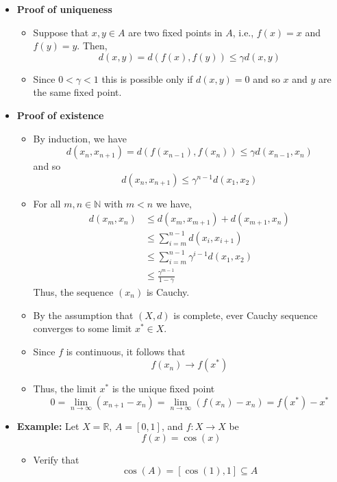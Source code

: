 \documentclass[11pt,twoside]{report}
\newcommand{\bbN}{{\mathbb{N}}}
\newcommand{\bbR}{{\mathbb{R}}}
\begin{document}
\begin{itemize}
\item \textbf{Proof of uniqueness}

\begin{itemize}
\item Suppose that $x, y \in A$ are two fixed points in $A$, i.e., $f(x) = x$ and $f(y) = y$. Then, 
\[
d(x,y) = d(f(x),f(y)) \le \gamma d(x,y) 
\]
\item Since $0 <  \gamma <1$ this is possible only if $d(x,y) = 0$ and so $x$ and $y$ are the same fixed point. 
\end{itemize}

\item \textbf{Proof of existence}

\begin{itemize}
\item  By induction, we have 
\[
d(x_{n}, x_{n+1}) = d(f(x_{n-1}), f(x_n)) \le \gamma d(x_{n-1}, x_{n}) 
\]
and so 
\[
d(x_{n}, x_{n+1}) \le \gamma^{n-1} d( x_1,x_2)
\]
\item  For all $m , n \in \bbN$ with $m <  n$ we have, 
\begin{align*}
d(x_m, x_n) &\le d(x_m, x_{m+1}) + d(x_{m+1},  x_n) \\
& \le \sum_{i=m}^{n-1} d(x_i, x_{i+1})  \\
& \le \sum_{i=m}^{n-1} \gamma^{i-1}  d(x_1, x_2)  \\
& \le \frac{ \gamma^{m-1}}{ 1- \gamma} 
\end{align*}
Thus, the sequence $(x_n)$ is Cauchy. 

\item By the assumption that $(X, d)$ is complete, ever Cauchy sequence converges to some limit $x^* \in X$. 

\item Since $f$ is continuous, it follows that 
\[
f(x_n) \to f(x^*)
\]
\item Thus, the limit $x^*$ is the unique fixed point
\[
 0 = \lim_{n \to \infty}   ( x_{n+1}  - x_{n}  )  =  \lim_{n \to \infty}   ( f(x_{n})  - x_{n}  ) =  f(x^*) - x^*%
\]
\end{itemize}



\item \textbf{Example:}  Let $X = \bbR$, $A  = [0,1]$,   and $f \colon X \to X$ be 
\[
f(x)  = \cos(x)
\]
\begin{itemize}

\item  Verify that  
\[
\cos(A) = [\cos(1), 1] \subseteq A
\]



\end{itemize}
\end{itemize}
\end{document}

